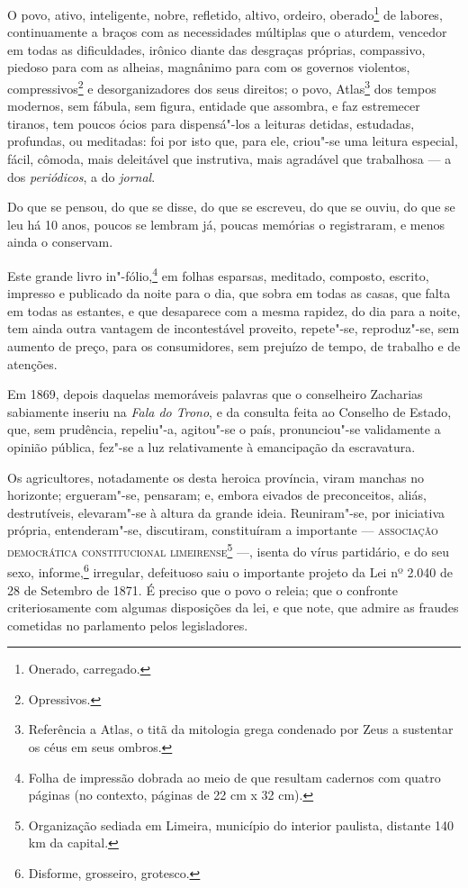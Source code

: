 O povo, ativo, inteligente, nobre, refletido, altivo, ordeiro,
oberado\footnote{Onerado, carregado.} de labores, continuamente a
braços com as necessidades múltiplas que o aturdem, vencedor em todas as
dificuldades, irônico diante das desgraças próprias, compassivo, piedoso
para com as alheias, magnânimo para com os governos violentos,
compressivos\footnote{Opressivos.} e desorganizadores dos seus
direitos; o povo, Atlas\footnote{Referência a Atlas, o titã da
  mitologia grega condenado por Zeus a sustentar os céus em seus ombros.}
dos tempos modernos, sem fábula, sem figura, entidade que assombra, e
faz estremecer tiranos, tem poucos ócios para dispensá"-los a leituras
detidas, estudadas, profundas, ou meditadas: foi por isto que, para ele,
criou"-se uma leitura especial, fácil, cômoda, mais deleitável que
instrutiva, mais agradável que trabalhosa --- a dos \emph{periódicos},
a do \emph{jornal}.

Do que se pensou, do que se disse, do que se escreveu, do que se ouviu,
do que se leu há 10 anos, poucos se lembram já, poucas memórias o
registraram, e menos ainda o conservam.

Este grande livro in"-fólio,\footnote{
  Folha de impressão dobrada ao meio de que resultam cadernos com quatro páginas (no
  contexto, páginas de 22 cm x 32 cm).} em folhas esparsas, meditado,
composto, escrito, impresso e publicado da noite para o dia, que sobra
em todas as casas, que falta em todas as estantes, e que desaparece com
a mesma rapidez, do dia para a noite, tem ainda outra vantagem de
incontestável proveito, repete"-se, reproduz"-se, sem aumento de preço,
para os consumidores, sem prejuízo de tempo, de trabalho e de atenções.

Em 1869, depois daquelas memoráveis palavras que o conselheiro Zacharias
sabiamente inseriu na \emph{Fala do Trono}, e da consulta feita ao
Conselho de Estado, que, sem prudência, repeliu"-a, agitou"-se o país,
pronunciou"-se validamente a opinião pública, fez"-se a luz relativamente
à emancipação da escravatura.

Os agricultores, notadamente os desta heroica província, viram manchas
no horizonte; ergueram"-se, pensaram; e, embora eivados de preconceitos,
aliás, destrutíveis, elevaram"-se à altura da grande ideia. Reuniram"-se,
por iniciativa própria, entenderam"-se, discutiram, constituíram a
importante --- \textsc{associação democrática constitucional
limeirense}\footnote{Organização sediada em Limeira, município do
  interior paulista, distante 140 km da capital.} ---, isenta do vírus
partidário, e do seu sexo, informe,\footnote{Disforme, grosseiro,
  grotesco.} irregular, defeituoso saiu o importante projeto da Lei nº
2.040 de 28 de Setembro de 1871. É preciso que o povo o releia; que o
confronte criteriosamente com algumas disposições da lei, e que note,
que admire as fraudes cometidas no parlamento pelos legisladores.

